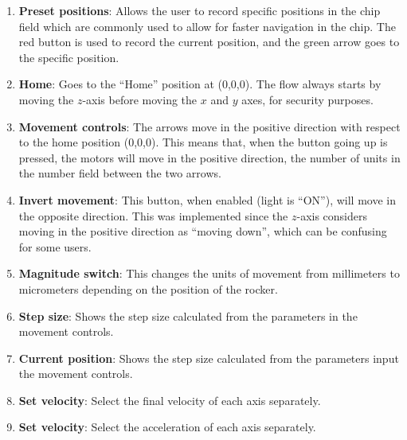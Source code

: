 \begin{enumerate}
\item \textbf{Preset positions}: Allows the user to record specific positions in the chip field which are commonly used to allow for faster navigation in the chip. The red button is used to record the current position, and the green arrow goes to the specific position. 
\item \textbf{Home}: Goes to the ``Home'' position at (0,0,0). The flow always starts by moving the $z$-axis before moving the $x$ and $y$ axes, for security purposes.
\item \textbf{Movement controls}: The arrows move in the positive direction with respect to the home position (0,0,0). This means that, when the button going up is pressed, the motors will move in the positive direction, the number of units in the number field between the two arrows. 
\item \textbf{Invert movement}: This button, when enabled (light is ``ON''), will move in the opposite direction. This was implemented since the $z$-axis considers moving in the positive direction as ``moving down'', which can be confusing for some users.
\item \textbf{Magnitude switch}: This changes the units of movement from millimeters to micrometers depending on the position of the rocker. 
\item \textbf{Step size}: Shows the step size calculated from the parameters in the movement controls.
\item \textbf{Current position}: Shows the step size calculated from the parameters input the movement controls.
\item \textbf{Set velocity}: Select the final velocity of each axis separately.
\item \textbf{Set velocity}: Select the acceleration of each axis separately.
\end{enumerate}
